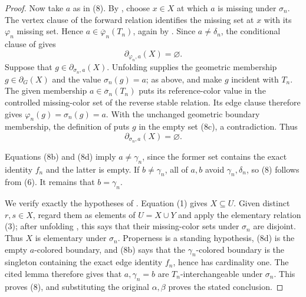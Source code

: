 \begin{proof}
Now take $a$ as in (8).  By , choose
$x\in X$ at which $a$ is missing under $\sigma_n$.  The vertex clause of
the forward  relation identifies the missing set
at $x$ with its $\varphi_n$ missing set.  Hence
$a\in\overline\varphi_n(T_n)$, again by
.  Since $a\ne\delta_n$, the conditional clause
of  gives
\[
              \partial_{\varphi_n,a}(X)=\varnothing.         \tag{8c}
\]
Suppose that $g\in\partial_{\sigma_n,a}(X)$.  Unfolding
 supplies the geometric membership
$g\in\partial_G(X)$ and the value $\sigma_n(g)=a$; as above,
 and  make $g$ incident
with $T_n$.  The given membership
$a\in\overline\sigma_n(T_n)$ puts its reference-color value in the
controlled missing-color set of the reverse stable relation.  Its edge
clause therefore gives $\varphi_n(g)=\sigma_n(g)=a$.  With the unchanged
geometric boundary membership, the definition of
 puts $g$ in the empty set (8c), a
contradiction.  Thus
\[
              \partial_{\sigma_n,a}(X)=\varnothing.          \tag{8d}
\]

Equations (8b) and (8d) imply $a\ne\gamma_n$, since the former set
contains the exact identity $f_n$ and the latter is empty.  If
$b\ne\gamma_n$, all of $a,b$ avoid $\gamma_n,\delta_n$, so (8) follows
from (6).  It remains that $b=\gamma_n$.

We verify exactly the hypotheses of
.  Equation (1) gives
$X\subseteq U$.  Given distinct $r,s\in X$, regard them as elements of
$U=X\cup Y$ and apply the elementary relation (3); after unfolding
, this says that their missing-color
sets under $\sigma_n$ are disjoint.  Thus $X$ is elementary under
$\sigma_n$.  Properness is a standing hypothesis, (8d) is the empty
$a$-colored boundary, and (8b) says that the
$\gamma_n$-colored boundary is the singleton containing the exact edge
identity $f_n$, hence has cardinality one.  The cited lemma therefore
gives that $a,\gamma_n=b$ are $T_n$-interchangeable under $\sigma_n$.
This proves (8), and substituting the original $\alpha,
\beta$ proves the stated conclusion.
\end{proof}
